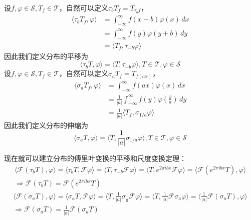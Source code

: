 \documentclass{ctexbook}
\begin{document}
设$f,\varphi\in\mathcal{S} ,T_f\in\mathcal{T} $，自然可以定义$\tau_b T_f=T_{\tau_b f}$，
\begin{align*}
    \langle \tau_b T_f,\varphi\rangle & =\int_{-\infty}^{\infty}f(x-b)\varphi(x)\,dx \\
                                      & =\int_{-\infty}^{\infty}f(y)\varphi(y+b)\,dy \\
                                      & =\langle T_f,\tau_{-b}\varphi\rangle
\end{align*}
因此我们定义分布的平移为
\begin{equation}
    \langle \tau_b T,\varphi\rangle=\langle T,\tau_{-b}\varphi\rangle,T\in\mathcal{T} ,\varphi\in\mathcal{S}
\end{equation}
设$f,\varphi\in\mathcal{S} ,T_f\in\mathcal{T} $，自然可以定义$\sigma_a T_f=T_{f(ax)}$，
\begin{align*}
    \langle \sigma_a T_f,\varphi\rangle & =\int_{-\infty}^{\infty}f(ax)\varphi(x)\,dx                                  \\
                                        & =\frac{1}{|a|}\int_{-\infty}^{\infty}f(y)\varphi\left(\frac{y}{a}\right)\,dy \\
                                        & =\frac{1}{|a|}\langle T_f,\sigma_{1/a}\varphi\rangle
\end{align*}
因此我们定义分布的伸缩为
\begin{equation}
    \langle\sigma_a T,\varphi\rangle=\langle T,\frac{1}{|a|}\sigma_{1/a}\varphi\rangle,T\in\mathcal{T} ,\varphi\in\mathcal{S}
\end{equation}

现在就可以建立分布的傅里叶变换的平移和尺度变换定理：
\begin{align*}
    \langle\mathcal{F}(\tau_b T),\varphi\rangle =\langle \tau_b T,\mathcal{F}\varphi\rangle=\langle T,\tau_{-b}\mathcal{F}\varphi\rangle=\langle T,e^{2\pi ibx}\mathcal{F}\varphi\rangle=\langle \mathcal{F}(e^{2\pi ibx}T),\varphi\rangle \\
    \Rightarrow\mathcal{F}(\tau_b T)           =\mathcal{F}(e^{2\pi ibx}T)
\end{align*}
\begin{align*}
    \langle\mathcal{F}(\sigma_a T),\varphi\rangle =\langle \sigma_a T,\mathcal{F}\varphi\rangle=\langle T,\frac{1}{|a|}\sigma_{\frac{1}{a}}\mathcal{F}\varphi\rangle=\langle T,\frac{1}{|a|}\mathcal{F}\sigma_a \varphi\rangle=\langle \frac{1}{|a|}\mathcal{F}(\sigma_a T),\varphi\rangle \\
    \Rightarrow\mathcal{F}(\sigma_a T)           =\frac{1}{|a|}\mathcal{F}(\sigma_a T)
\end{align*}
\end{document}
